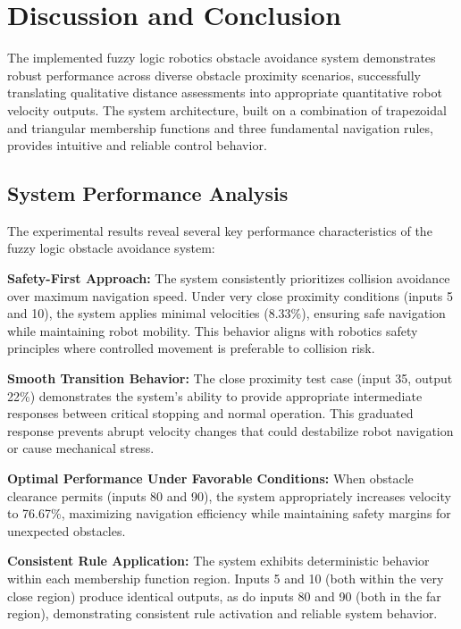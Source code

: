 \documentclass[11pt,a4paper]{article}
\begin{document}
\section{Discussion and Conclusion}

The implemented fuzzy logic robotics obstacle avoidance system demonstrates robust performance across diverse obstacle proximity scenarios, successfully translating qualitative distance assessments into appropriate quantitative robot velocity outputs. The system architecture, built on a combination of trapezoidal and triangular membership functions and three fundamental navigation rules, provides intuitive and reliable control behavior.

\subsection{System Performance Analysis}

The experimental results reveal several key performance characteristics of the fuzzy logic obstacle avoidance system:

\textbf{Safety-First Approach:} The system consistently prioritizes collision avoidance over maximum navigation speed. Under very close proximity conditions (inputs 5 and 10), the system applies minimal velocities (8.33\%), ensuring safe navigation while maintaining robot mobility. This behavior aligns with robotics safety principles where controlled movement is preferable to collision risk.

\textbf{Smooth Transition Behavior:} The close proximity test case (input 35, output 22\%) demonstrates the system's ability to provide appropriate intermediate responses between critical stopping and normal operation. This graduated response prevents abrupt velocity changes that could destabilize robot navigation or cause mechanical stress.

\textbf{Optimal Performance Under Favorable Conditions:} When obstacle clearance permits (inputs 80 and 90), the system appropriately increases velocity to 76.67\%, maximizing navigation efficiency while maintaining safety margins for unexpected obstacles.

\textbf{Consistent Rule Application:} The system exhibits deterministic behavior within each membership function region. Inputs 5 and 10 (both within the very close region) produce identical outputs, as do inputs 80 and 90 (both in the far region), demonstrating consistent rule activation and reliable system behavior.
\end{document}
